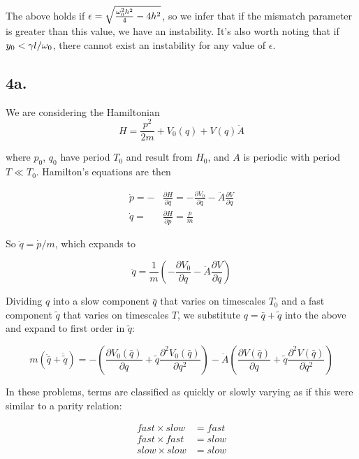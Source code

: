 \documentclass[12pt]{article}
\begin{document}
The above holds if \(\epsilon = \sqrt{\frac{\omega_0^2h^2}{4}-4h^2}\), so we infer that if the mismatch parameter is greater than this value, we have an instability. It's also worth noting that if \(y_0 < \gamma l/\omega_0\), there cannot exist an instability for any value of \(\epsilon\).

\newpage

\subsection*{4a.}

We are considering the Hamiltonian 
\[H = \frac{p^2}{2m} + V_0(q) + V(q)\ddot{A}
\]

where \(p_0\), \(q_0\) have period \(T_0\) and result from \(H_0\), and \(A\) is periodic with period \(T\ll T_0\). Hamilton's equations are then

\begin{align*}
\dot{p} = -&\frac{\partial H}{\partial q} = -\frac{\partial V_0}{\partial q} -\ddot{A}\frac{\partial V}{\partial q} \\
\dot{q} = &\frac{\partial H}{\partial p} = \frac{p}{m}
\end{align*}

So \(\ddot{q} = \dot{p}/m\), which expands to

\[ \ddot{q} = \frac{1}{m}\left( -\frac{\partial V_0}{\partial q} -\ddot{A}\frac{\partial V}{\partial q} \right)
\]

\newcommand{\ddb}[1]{\ddot{\bar{#1}}}
\newcommand{\db}[1]{\dot{\bar{#1}}}
\newcommand{\ddti}[1]{\ddot{\tilde{#1}}}
\newcommand{\dti}[1]{\dot{\tilde{#1}}}

Dividing \(q\) into a slow component \(\bar{q}\) that varies on timescales \(T_0\) and a fast component \(\tilde{q}\) that varies on timescales \(T\), we substitute \(q = \bar{q}+\tilde{q}\) into the above and expand to first order in \(\tilde{q}\):

\[ m(\ddb{q} + \ddti{q}) =  -\left(\frac{\partial V_0(\bar{q})}{\partial q} + \tilde{q}\frac{\partial^2 V_0(\bar{q})}{\partial q^2}\right) - \ddot{A}\left(\frac{\partial V(\bar{q})}{\partial q} + \tilde{q}\frac{\partial^2 V(\bar{q})}{\partial q^2}\right)
\]

In these problems, terms are classified as quickly or slowly varying as if this were similar to a parity relation:

\begin{align*}
fast \times slow &= fast \\
fast \times fast &= slow \\
slow \times slow &= slow
\end{align*}
\end{document}
